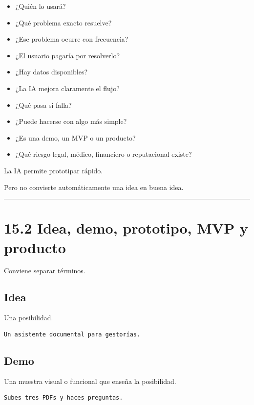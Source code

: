 \begin{itemize}
\tightlist
\item
  ¿Quién lo usará?
\item
  ¿Qué problema exacto resuelve?
\item
  ¿Ese problema ocurre con frecuencia?
\item
  ¿El usuario pagaría por resolverlo?
\item
  ¿Hay datos disponibles?
\item
  ¿La IA mejora claramente el flujo?
\item
  ¿Qué pasa si falla?
\item
  ¿Puede hacerse con algo más simple?
\item
  ¿Es una demo, un MVP o un producto?
\item
  ¿Qué riesgo legal, médico, financiero o reputacional existe?
\end{itemize}

La IA permite prototipar rápido.

Pero no convierte automáticamente una idea en buena idea.

\begin{center}\rule{0.5\linewidth}{0.5pt}\end{center}

\section{15.2 Idea, demo, prototipo, MVP y
producto}\label{idea-demo-prototipo-mvp-y-producto}

Conviene separar términos.

\subsection{Idea}\label{idea}

Una posibilidad.

\begin{lstlisting}
Un asistente documental para gestorías.
\end{lstlisting}

\subsection{Demo}\label{demo-2}

Una muestra visual o funcional que enseña la posibilidad.

\begin{lstlisting}
Subes tres PDFs y haces preguntas.
\end{lstlisting}

